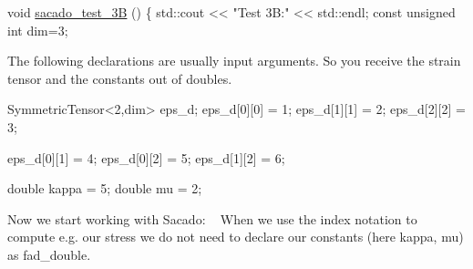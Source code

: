\begin{DoxyCode}
\textcolor{keywordtype}{void} \hyperlink{example__code__to__be__documented_8cc_ae63cc8526935cb0512668e83cfc7b929}{sacado\_test\_3B} ()
\{
    std::cout << \textcolor{stringliteral}{"Test 3B:"} << std::endl;
    \textcolor{keyword}{const} \textcolor{keywordtype}{unsigned} \textcolor{keywordtype}{int} dim=3;
\end{DoxyCode}
 The following declarations are usually input arguments. So you receive the strain tensor and the constants out of doubles. 
\begin{DoxyCode}
SymmetricTensor<2,dim> eps\_d;
eps\_d[0][0] = 1;
eps\_d[1][1] = 2;
eps\_d[2][2] = 3;

eps\_d[0][1] = 4;
eps\_d[0][2] = 5;
eps\_d[1][2] = 6;

\textcolor{keywordtype}{double} kappa = 5;
\textcolor{keywordtype}{double} mu = 2;
\end{DoxyCode}
 Now we start working with Sacado\+: ~\newline
When we use the index notation to compute e.\+g. our stress we do not need to declare our constants (here kappa, mu) as fad\+\_\+double.

